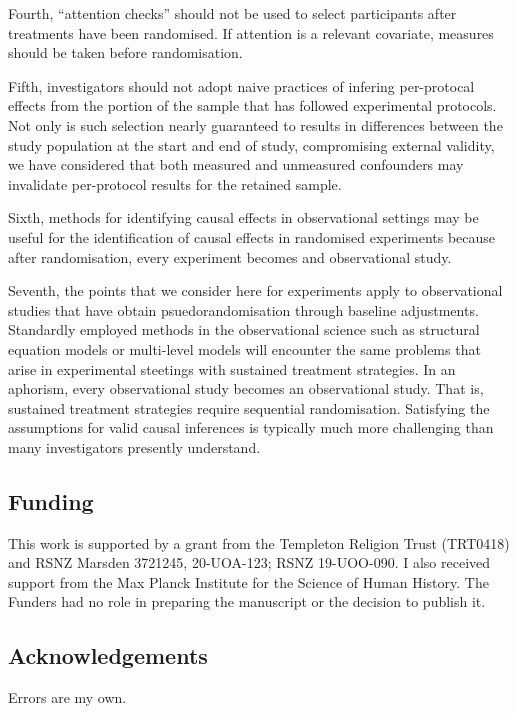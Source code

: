 \documentclass[
  single column]{article}
\begin{document}
Fourth, ``attention checks'' should not be used to select participants
after treatments have been randomised. If attention is a relevant
covariate, measures should be taken before randomisation.

Fifth, investigators should not adopt naive practices of infering
per-protocal effects from the portion of the sample that has followed
experimental protocols. Not only is such selection nearly guaranteed to
results in differences between the study population at the start and end
of study, compromising external validity, we have considered that both
measured and unmeasured confounders may invalidate per-protocol results
for the retained sample.

Sixth, methods for identifying causal effects in observational settings
may be useful for the identification of causal effects in randomised
experiments because after randomisation, every experiment becomes and
observational study.

Seventh, the points that we consider here for experiments apply to
observational studies that have obtain psuedorandomisation through
baseline adjustments. Standardly employed methods in the observational
science such as structural equation models or multi-level models will
encounter the same problems that arise in experimental steetings with
sustained treatment strategies. In an aphorism, every observational
study becomes an observational study. That is, sustained treatment
strategies require sequential randomisation. Satisfying the assumptions
for valid causal inferences is typically much more challenging than many
investigators presently understand.

\newpage{}

\subsection{Funding}\label{funding}

This work is supported by a grant from the Templeton Religion Trust
(TRT0418) and RSNZ Marsden 3721245, 20-UOA-123; RSNZ 19-UOO-090. I also
received support from the Max Planck Institute for the Science of Human
History. The Funders had no role in preparing the manuscript or the
decision to publish it.

\subsection{Acknowledgements}\label{acknowledgements}

Errors are my own.
\end{document}
